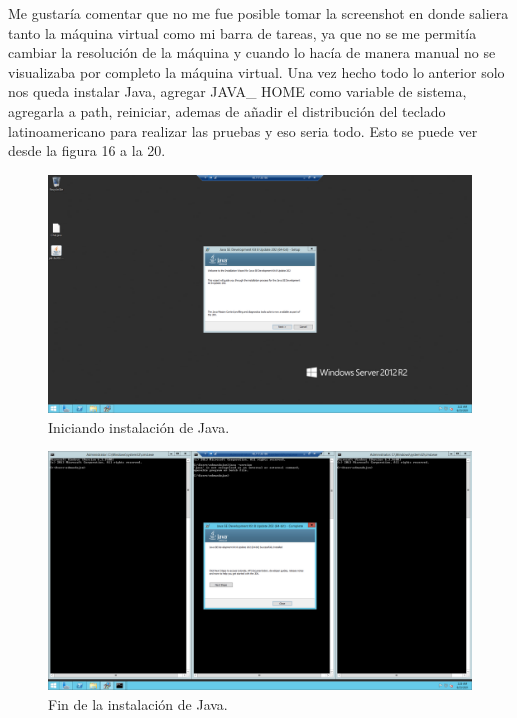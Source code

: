 \documentclass[11pt]{article}
\begin{document}
Me gustaría comentar que no me fue posible tomar la screenshot en donde saliera tanto la máquina virtual como mi barra de tareas, ya que no se me permitía cambiar la resolución de la máquina y cuando lo hacía de manera manual no se visualizaba por completo la máquina virtual.
Una vez hecho todo lo anterior solo nos queda instalar Java, agregar JAVA\_ HOME como variable de sistema, agregarla a path, reiniciar, ademas de añadir el distribución del teclado latinoamericano para realizar las pruebas y eso seria todo. Esto se puede ver desde la figura 16 a la 20.
		\begin{figure}[H]
			\centering
			\includegraphics[scale=0.34]{resources/inicioinstalacionjava.png}
			\caption{Iniciando instalación de Java.}\label{fig:picture}
		\end{figure}
		\begin{figure}[H]
			\centering
			\includegraphics[scale=0.34]{resources/instalacionjavafinalizada.png}
			\caption{Fin de la instalación de Java.}\label{fig:picture}
		\end{figure}
\end{document}
